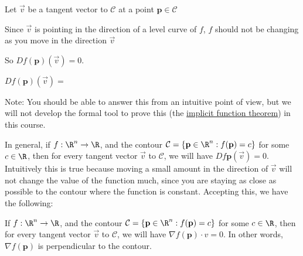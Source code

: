 \documentclass{ximera}
\begin{document}

\begin{question}
	Let $\vec{v}$ be a tangent vector to $\mathcal{C}$ at a point $\mathbf{p} \in \mathcal{C}$ 
	\begin{solution}
		\begin{hint}
			Since $\vec{v}$ is pointing in the direction of a level curve of $f$, $f$ should not be changing as you move in the direction $\vec{v}$
		\end{hint}
		\begin{hint}
			So $Df(\mathbf{p})(\vec{v}) = 0$.
		\end{hint}
		$Df(\mathbf{p})(\vec{v}) = $ 
		
		Note:  You should be able to answer this from an intuitive point of view, but we will not develop the formal tool to prove this 
	(the \href{http://en.wikipedia.org/wiki/Implicit_function_theorem}{implicit function theorem}) in this course.
	\end{solution}
	
	
\end{question}

In general, if $f:\R^n \to \R$, and the contour $\mathcal{C} = \{ \mathbf{p} \in \R^n :  f(\mathbf{p}) = c \}$ for some $c \in \R$, then for every tangent 
vector $\vec{v}$ to $\mathcal{C}$, we will have $Df{\mathbf{p}}(\vec{v}) =0$.  
Intuitively this is true because moving a small amount in the direction of $\vec{v}$ will not change the value of the function much,
 since you are staying as close as possible to the contour where the function is constant.  Accepting this, we have the following:
 
 \begin{theorem}
  	If $f:\R^n \to \R$, and the contour $\mathcal{C} = \{ \mathbf{p} \in \R^n :  f(\mathbf{p}) = c \}$ for some $c \in \R$, then for every tangent 
vector $\vec{v}$ to $\mathcal{C}$, we will have $\nabla f(\mathbf{p}) \cdot v  =0$.  In other words, $\nabla f(\mathbf{p})$ is perpendicular to the 
contour.
 \end{theorem}
 
 
\end{document}
